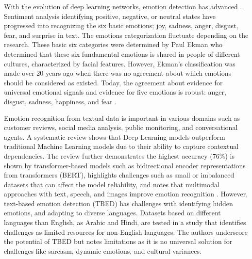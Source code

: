 With the evolution of deep learning networks, emotion detection has advanced \autocite{Safari2023}. Sentiment analysis identifying positive, negative, or neutral states have progressed into recognizing the six basic emotions; joy, sadness, anger, disgust, fear, and surprise in text. The emotions categorization fluctuate depending on the research. These basic six categories were determined by Paul Ekman \autocite{Oatley2019, Kusal2023} who determined that these six fundamental emotions is shared in people of different cultures, characterized by facial features. However, Ekman’s classification was made over 20 years ago when there was no agreement about which emotions should be considered as existed. Today, the agreement about evidence for universal emotional signals and evidence for five emotions is robust: anger, disgust, sadness, happiness, and fear \autocite{Ekman2016}.

Emotion recognition from textual data is important in various domains such as customer reviews, social media analysis, public monitoring, and conversational agents. A systematic review \autocite{Kusal2023} shows that Deep Learning models outperform traditional Machine Learning models due to their ability to capture contextual dependencies. The review further demonstrates the highest accuracy (76\%) is shown by transformer-based models such as bidirectional encoder representations from transformers (BERT), highlights challenges such as small or imbalanced datasets that can affect the model reliability, and notes that multimodal approaches with text, speech, and images improve emotion recognition \autocite{Madhuri2021}. However, text-based emotion detection (TBED) has challenges with identifying hidden emotions, and adapting to diverse languages. Datasets based on different languages than English, as Arabic and Hindi, are tested in a study \autocite{Maruf2024} that identifies challenges as limited resources for non-English languages. The authors underscore the potential of TBED but notes limitations as it is no universal solution for challenges like sarcasm, dynamic emotions, and cultural variances.

